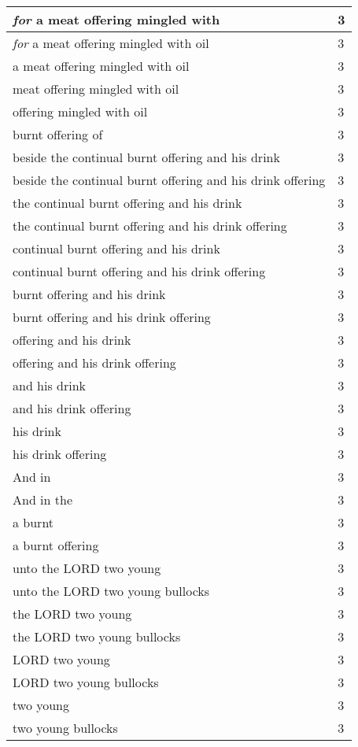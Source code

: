 \begin{center}
\begin{longtable}{|p{3.0in}|p{0.5in}|}
\emph{for} a meat offering mingled with & 3\\ \hline 
\emph{for} a meat offering mingled with oil & 3\\ \hline 
a meat offering mingled with oil & 3\\ \hline 
meat offering mingled with oil & 3\\ \hline 
offering mingled with oil & 3\\ \hline 
burnt offering of & 3\\ \hline 
beside the continual burnt offering and his drink & 3\\ \hline 
beside the continual burnt offering and his drink offering & 3\\ \hline 
the continual burnt offering and his drink & 3\\ \hline 
the continual burnt offering and his drink offering & 3\\ \hline 
continual burnt offering and his drink & 3\\ \hline 
continual burnt offering and his drink offering & 3\\ \hline 
burnt offering and his drink & 3\\ \hline 
burnt offering and his drink offering & 3\\ \hline 
offering and his drink & 3\\ \hline 
offering and his drink offering & 3\\ \hline 
and his drink & 3\\ \hline 
and his drink offering & 3\\ \hline 
his drink & 3\\ \hline 
his drink offering & 3\\ \hline 
And in & 3\\ \hline 
And in the & 3\\ \hline 
a burnt & 3\\ \hline 
a burnt offering & 3\\ \hline 
unto the LORD two young & 3\\ \hline 
unto the LORD two young bullocks & 3\\ \hline 
the LORD two young & 3\\ \hline 
the LORD two young bullocks & 3\\ \hline 
LORD two young & 3\\ \hline 
LORD two young bullocks & 3\\ \hline 
two young & 3\\ \hline 
two young bullocks & 3\\ \hline 

\end{longtable}
\end{center}
